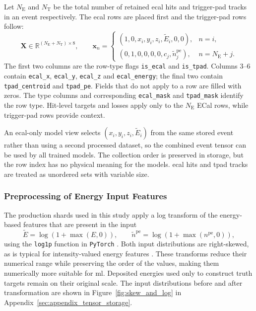 Let \(N_{\mathrm{E}}\) and \(N_{\mathrm{T}}\) be the total number of retained
\gls{ecal} hits and trigger-pad tracks in an event respectively. The \gls{ecal} rows are placed
first and the trigger-pad rows follow:
\begin{equation}
    \mathbf{X}
    \in
    \mathbb{R}^{(N_{\mathrm{E}}+N_{\mathrm{T}})\times 8},
    \qquad
    \mathbf{x}_n =
    \begin{cases}
        (1,0,x_i,y_i,z_i,\widetilde{E}_i,0,0),
        & n=i, \\[2mm]
        (0,1,0,0,0,0,c_j,\widetilde{n}^{\mathrm{pe}}_j),
        & n=N_{\mathrm{E}}+j .
    \end{cases}
    \label{eq:combined_event_tensor}
\end{equation}
The first two columns are the row-type flags \texttt{is\_ecal} and
\texttt{is\_tpad}. Columns 3--6 contain \texttt{ecal\_x},
\texttt{ecal\_y}, \texttt{ecal\_z} and \texttt{ecal\_energy}; the final two
contain \texttt{tpad\_centroid} and \texttt{tpad\_pe}. Fields that do not
apply to a row are filled with zeros. The type columns and corresponding
\texttt{ecal\_mask} and \texttt{tpad\_mask} identify the row type. Hit-level
targets and losses apply only to the \(N_{\mathrm{E}}\) ECal rows, while
trigger-pad rows provide context.

An \gls{ecal}-only model view selects
\((x_i,y_i,z_i,\widetilde{E}_i)\) from the same stored event rather than
using a second processed dataset, so the combined event tensor can be used by
all trained models. The collection order is preserved in storage, but the row
index has no physical meaning for the models. \gls{ecal} hits and \gls{tpad}
tracks are treated as unordered sets with variable size.

\subsubsection{Preprocessing of Energy Input Features}
\label{sec:preprocess}

The production shards used in this study apply a log transform of the energy-based features that are present in the input
\begin{equation}
    \widetilde{E}
    = \log\!\left(1+\max(E,0)\right),
    \qquad
    \widetilde{n}^{\mathrm{pe}}
    = \log\!\left(1+\max(n^{\mathrm{pe}},0)\right),
    \label{eq:input_log_transforms}
\end{equation}
using the \texttt{log1p} function in \texttt{PyTorch}
\cite{pytorch_log1p}. Both input distributions are right-skewed, as is typical
for intensity-valued energy features \cite{lai2024shower}. These
transforms reduce their numerical range while preserving the order of the
values, making them numerically more suitable for \gls{ml}. Deposited energies
used only to construct truth targets remain on their original scale. The input
distributions before and after transformation are shown in
Figure~\ref{fig:skew_and_log} in
Appendix~\ref{sec:appendix_tensor_storage}.

